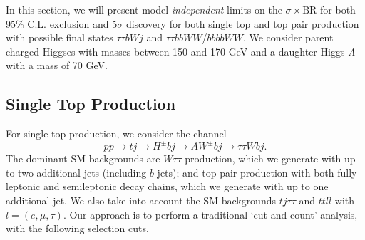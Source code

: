 In this section, we will present model \emph{independent} limits on the $\sigma\times\text{BR}$ for both 95\% C.L. exclusion and 5$\sigma$ discovery for both single top and top pair production with possible final states $\tau\tau bW j$ and $\tau\tau bbWW$/$bbbbWW$. We consider parent charged Higgses with masses between 150 and 170 GeV and a daughter Higgs \emph{A} with a mass of 70 GeV. 

\subsection{Single Top Production}\label{subsec:light_charged_analysis_tj}
 
For single top production, we consider the channel
\[pp\rightarrow tj\rightarrow H^{\pm} bj\rightarrow AW^{\pm}bj \rightarrow \tau\tau W bj.\]
The dominant SM backgrounds are $W\tau\tau$ production, which we generate with up to two additional jets (including $b$ jets); and top pair production with both fully leptonic and semileptonic decay chains, which we generate with up to one additional jet. We also take into account the SM backgrounds $tj\tau\tau$ and $ttll$ with $l= (e, \mu, \tau)$. Our approach is to perform a traditional `cut-and-count' analysis, with the following selection cuts.

